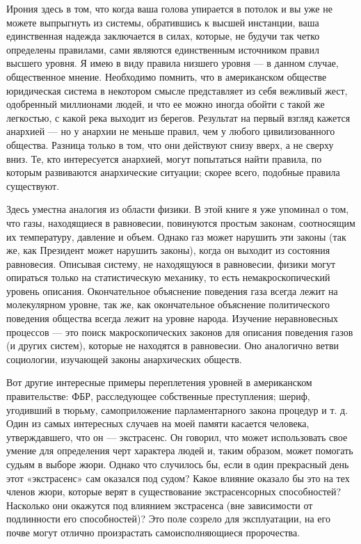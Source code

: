 Ирония здесь в том, что когда ваша голова упирается в потолок и вы уже не можете выпрыгнуть из системы, обратившись к высшей инстанции, ваша единственная надежда заключается в силах, которые, не будучи так четко определены правилами, сами являются единственным источником правил высшего уровня. Я имею в виду правила низшего уровня --- в данном случае, общественное мнение. Необходимо помнить, что в американском обществе юридическая система в некотором смысле представляет из себя вежливый жест, одобренный миллионами людей, и что ее можно иногда обойти с такой же легкостью, с какой река выходит из берегов. Результат на первый взгляд кажется анархией --- но у анархии не меньше правил, чем у любого цивилизованного общества. Разница только в том, что они действуют снизу вверх, а не сверху вниз. Те, кто интересуется анархией, могут попытаться найти правила, по которым развиваются анархические ситуации; скорее всего, подобные правила существуют.

Здесь уместна аналогия из области физики. В этой книге я уже упоминал о том, что газы, находящиеся в равновесии, повинуются простым законам, соотносящим их температуру, давление и объем. Однако газ может нарушить эти законы (так же, как Президент может нарушить законы), когда он выходит из состояния равновесия. Описывая систему, не находящуюся в равновесии, физики могут опираться только на статистическую механику, то есть немакроскопический уровень описания. Окончательное объяснение поведения газа всегда лежит на молекулярном уровне, так же, как окончательное объяснение политического поведения общества всегда лежит на уровне народа. Изучение неравновесных процессов --- это поиск макроскопических законов для описания поведения газов (и других систем), которые не находятся в равновесии. Оно аналогично ветви социологии, изучающей законы анархических обществ.

Вот другие интересные примеры переплетения уровней в американском правительстве: ФБР, расследующее собственные преступления; шериф, угодивший в тюрьму, самоприложение парламентарного закона процедур и т. д. Один из самых интересных случаев на моей памяти касается человека, утверждавшего, что он --- экстрасенс. Он говорил, что может использовать свое умение для определения черт характера людей и, таким образом, может помогать судьям в выборе жюри. Однако что случилось бы, если в один прекрасный день этот «экстрасенс» сам оказался под судом? Какое влияние оказало бы это на тех членов жюри, которые верят в существование экстрасенсорных способностей? Насколько они окажутся под влиянием экстрасенса (вне зависимости от подлинности его способностей)? Это поле созрело для эксплуатации, на его почве могут отлично произрастать самоисполняющиеся пророчества.

